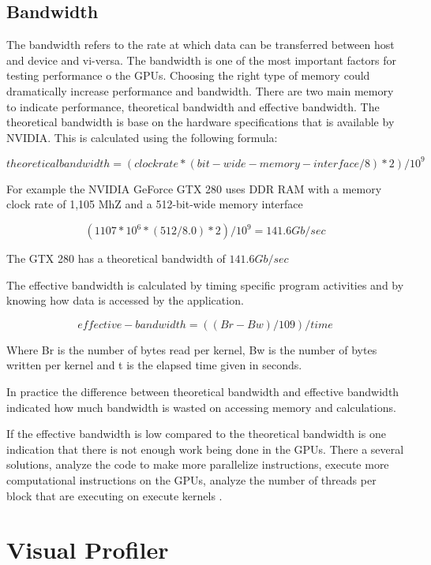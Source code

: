 \subsection{Bandwidth}

The bandwidth refers to the rate at which data can be transferred between host and device and vi-versa. The bandwidth is one of the most important factors for testing performance o the GPUs.  Choosing the right type of memory could dramatically increase performance and bandwidth.  There are two main memory to indicate performance, theoretical bandwidth and effective bandwidth.
The theoretical bandwidth is base on the hardware specifications that is available by NVIDIA. This is calculated using the following formula:

$$ theoretical bandwidth = (clock rate * (bit-wide-memory-interface / 8 )*2) / 10^9 $$

For example the NVIDIA GeForce GTX 280 uses DDR RAM with a memory clock rate of 1,105 MhZ and a 512-bit-wide memory interface

$$ (1107 * 10^6 * (512/8.0) *2 )/10^9 = 141.6 Gb /sec$$

The GTX 280 has a theoretical bandwidth of $141.6Gb/sec$

The effective bandwidth is calculated by timing  specific program activities and by knowing how data is accessed by the application. \cite{practices}

$$effective-bandwidth = ((Br - Bw) / 109 )/time$$

Where Br is the number of bytes read per kernel, Bw is the number of bytes written per kernel and  t is the elapsed time given in seconds.  \cite{fortran}

In practice the difference between theoretical bandwidth and effective bandwidth indicated how much bandwidth is wasted on accessing memory and calculations. 

If the effective bandwidth is low compared to the theoretical bandwidth is one indication that there is not enough work being done in the GPUs. There a several solutions, analyze the code to make  more parallelize instructions, execute more computational instructions on the GPUs, analyze the number of threads per block that are executing on execute kernels .


\section{Visual Profiler}


